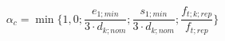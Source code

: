 \documentclass[12pt]{article}
\begin{document}
\begin{displaymath}
\alpha_c = \min { \{ 1,0 ; \frac {e_{1;min}} {3 \cdot d_{k;nom}} ; \frac {s_{1;min}} {3 \cdot d_{k;nom}} ; \frac {f_{t;k;rep}} {f_{t;rep}} \} } 
\end{displaymath}
\end{document}
